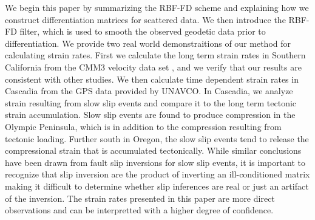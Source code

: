 \documentclass[10pt,a4paper]{article}
\begin{document}
We begin this paper by summarizing the RBF-FD scheme and explaining how we construct differentiation matrices for scattered data. We then introduce the RBF-FD filter, which is used to smooth the observed geodetic data prior to differentiation.  We provide two real world demonstraitions of our method for calculating strain rates.  First we calculate the long term strain rates in Southern California from the CMM3 velocity data set \citep{Shen2011}, and we verify that our results are consistent with other studies. We then calculate time dependent strain rates in Cascadia from the GPS data provided by UNAVCO.  In Cascadia, we analyze strain resulting from slow slip events and compare it to the long term tectonic strain accumulation. Slow slip events are found to produce compression in the Olympic Peninsula, which is in addition to the compression resulting from tectonic loading.  Further south in Oregon, the slow slip events tend to release the compressional strain that is accumulated tectonically.  While similar conclusions have been drawn from fault slip inversions for slow slip events, it is important to recognize that slip inversion are the product of inverting an ill-conditioned matrix making it difficult to determine whether slip inferences are real or just an artifact of the inversion.  The strain rates presented in this paper are more direct observations and can be interpretted with a higher degree of confidence. 
\end{document}
